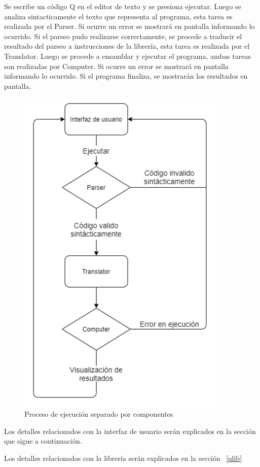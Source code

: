 Se escribe un código Q en el editor de texto y se presiona ejecutar. 
Luego se analiza sintacticamente el texto que representa al programa, esta tarea es realizada por el Parser. 
Si ocurre un error se mostrará en pantalla informando lo ocurrido. Si el parseo pudo realizarse correctamente, se procede a 
traducir el resultado del parseo a instrucciones de la librería, esta tarea es realizada por el Translator.
Luego se procede a ensamblar y ejecutar el programa, ambas tareas son realizadas por Computer.
Si ocurre un error se mostrará en pantalla informando lo ocurrido. 
Si el programa finaliza, se mostrarán los resultados en pantalla.
\begin{figure}[H]
  \centering
  \includegraphics[width=10cm]{figuras/ejecucion_diagrama.png}
  \caption{Proceso de ejecución separado por componentes}
\end{figure}

Los detalles relacionados con la interfaz de usuario serán explicados en la sección que sigue a continuación.

Los detalles relacionados con la librería serán explicados en la sección ~\ref{qlib}


